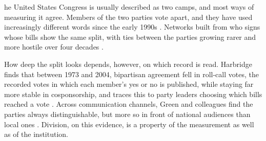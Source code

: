 \documentclass[9pt,twocolumn,twoside]{pnas-new}
\begin{document}
\begin{abstract}
House members vote along party lines, but how divided are they in whom they name? We draw the
119th House (2025--2026) twice on the same 450 members: a working map, where two members are joined when one
cosponsors the other's bill, and a floor map, where they are joined when one names the other in a floor speech. At
equal size, 38.7\% of floor ties cross the party line against 28.6\% of working ties, and debate procedure explains
about two thirds of the floor map's division. Hand-coding 100 mentions shows that cross-party mentions are mostly
thanks and credit (69\%) and rarely disagreement (7\%). In 55,023 press releases, members in exposed seats name the
other party more often than safe-seat members, and mostly name partners, though seat and moderation cannot be
separated. The same members look more or less divided depending on the record read: bills, floor speeches or
press releases.
\end{abstract}


\maketitle
\thispagestyle{firststyle}

\Firstpage


he United States Congress is usually described as two camps, and most ways of measuring it agree.
Members of the two parties vote apart, and they have used increasingly different words since the early 1990s
\cite{gentzkow2019}. Networks built from who signs whose bills show the same split, with ties between the parties
growing rarer and more hostile over four decades \cite{neal2020}.

How deep the split looks depends, however, on which record is read. Harbridge finds that between 1973 and 2004,
bipartisan agreement fell in roll-call votes, the recorded votes in which each member's yes or no is published, while
staying far more stable in cosponsorship, and traces this to party leaders choosing which bills reached a vote
\cite{harbridge2015}. Across communication channels, Green and colleagues find the parties always distinguishable,
but more so in front of national audiences than local ones \cite{green2024}. Division, on this evidence, is a
property of the measurement as well as of the institution.
\end{document}
